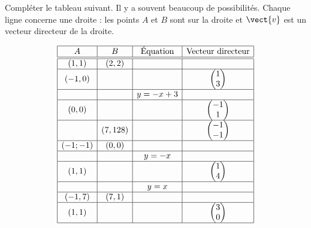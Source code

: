 
\begin{exercice}\label{exosmath-0155}

    Compléter le tableau suivant. Il y a souvent beaucoup de possibilités. Chaque ligne concerne une droite : les points \( A\) et \( B\) sont sur la droite et \( \vect{ v }\) est un vecteur directeur de la droite.

    \begin{equation*}
        \begin{array}[]{|c|c|c|c|}
            \hline
            A&B&\text{Équation}&\text{Vecteur directeur}\\
            \hline\hline
            (1,1)&(2,2)&&\\
            \hline
            (-1,0)&&&\begin{pmatrix}
                1    \\ 
                3    
            \end{pmatrix}\\
            \hline
            &&y=-x+3&\\
            \hline
            (0,0)&&&\begin{pmatrix}
                -1    \\ 
                1    
            \end{pmatrix}\\
            \hline
            &(7,128)&&\begin{pmatrix}
                -1    \\ 
                -1    
            \end{pmatrix}\\
            \hline
            (-1;-1)&(0,0)&&\\
            \hline
            &&y=-x&\\
            \hline
            (1,1)&&&\begin{pmatrix}
                1    \\ 
                4    
            \end{pmatrix}\\
            \hline
            &&y=x&\\
            \hline
            (-1,7)&(7,1)&&\\
            \hline
            (1,1)&&&\begin{pmatrix}
                3    \\ 
                0    
            \end{pmatrix}\\
            \hline
        \end{array}
    \end{equation*}

\end{exercice}
